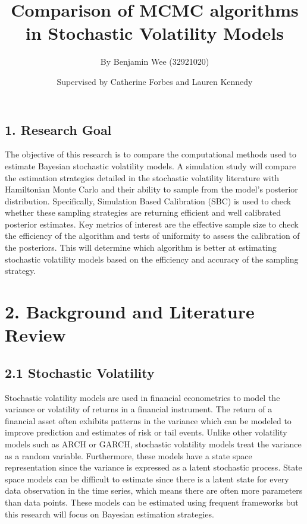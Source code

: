 \documentclass[
  12pt,
  letterpaper,
  DIV=11,
  numbers=noendperiod]{scrartcl}
\title{Comparison of MCMC algorithms in Stochastic Volatility Models}
\author{By Benjamin Wee (32921020) \and Supervised by Catherine Forbes
and Lauren Kennedy}
\date{}
\begin{document}
\maketitle
\ifdefined\Shaded\renewenvironment{Shaded}{\begin{tcolorbox}[interior hidden, borderline west={3pt}{0pt}{shadecolor}, sharp corners, boxrule=0pt, frame hidden, breakable, enhanced]}{\end{tcolorbox}}\fi

\hypertarget{research-goal}{%
\subsection{1. Research Goal}\label{research-goal}}

The objective of this research is to compare the computational methods
used to estimate Bayesian stochastic volatility models. A simulation
study will compare the estimation strategies detailed in the stochastic
volatility literature with Hamiltonian Monte Carlo and their ability to
sample from the model's posterior distribution. Specifically, Simulation
Based Calibration (SBC) is used to check whether these sampling
strategies are returning efficient and well calibrated posterior
estimates. Key metrics of interest are the effective sample size to
check the efficiency of the algorithm and tests of uniformity to assess
the calibration of the posteriors. This will determine which algorithm
is better at estimating stochastic volatility models based on the
efficiency and accuracy of the sampling strategy.

\hypertarget{background-and-literature-review}{%
\section{2. Background and Literature
Review}\label{background-and-literature-review}}

\hypertarget{stochastic-volatility}{%
\subsection{2.1 Stochastic Volatility}\label{stochastic-volatility}}

Stochastic volatility models are used in financial econometrics to model
the variance or volatility of returns in a financial instrument. The
return of a financial asset often exhibits patterns in the variance
which can be modeled to improve prediction and estimates of risk or tail
events. Unlike other volatility models such as ARCH or GARCH, stochastic
volatility models treat the variance as a random variable. Furthermore,
these models have a state space representation since the variance is
expressed as a latent stochastic process. State space models can be
difficult to estimate since there is a latent state for every data
observation in the time series, which means there are often more
parameters than data points. These models can be estimated using
frequent frameworks but this research will focus on Bayesian estimation
strategies.
\end{document}

